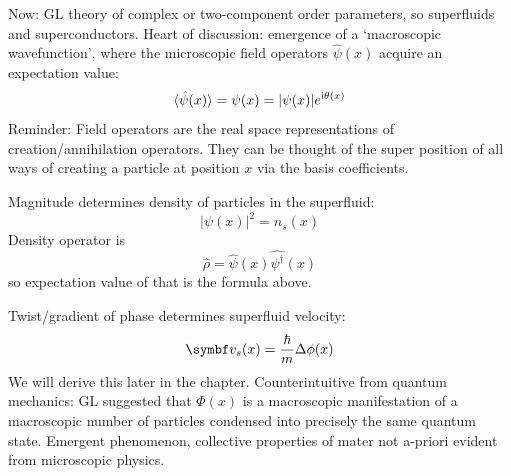 \documentclass[../notes.tex]{subfiles}
\begin{document}
Now: GL theory of complex or two-component order parameters, so superfluids and superconductors.
Heart of discussion: emergence of a `macroscopic wavefunction', where the microscopic field operators \(\hat{\psi}(x)\) acquire an expectation value:
\begin{equation}
	\braket{\hat{\psi} (x)} = \psi (x) = \vert \psi (x) \vert e^{\mathrm{i} \theta(x)}
\end{equation}
Reminder: Field operators are the real space representations of creation/annihilation operators.
They can be thought of the super position of all ways of creating a particle at position \(x\) via the basis coefficients.

Magnitude determines density of particles in the superfluid:
\begin{equation}
	\vert \psi(x) \vert^2 = n_s (x)
\end{equation}
Density operator is
\begin{equation}
	\hat{\rho} = \hat{\psi} (x) \hat{\psi^{\dagger}} (x)
\end{equation}
so expectation value of that is the formula above.

Twist/gradient of phase determines superfluid velocity:
\begin{equation}
	\vb{v}_s (x) = \frac{\hbar}{m} \Delta \phi (x)
\end{equation}
We will derive this later in the chapter.
Counterintuitive from quantum mechanics: GL suggested that \(\Phi(x)\) is a macroscopic manifestation of a macroscopic number of particles condensed into precisely the same quantum state.
Emergent phenomenon, collective properties of mater not a-priori evident from microscopic physics.
\end{document}
